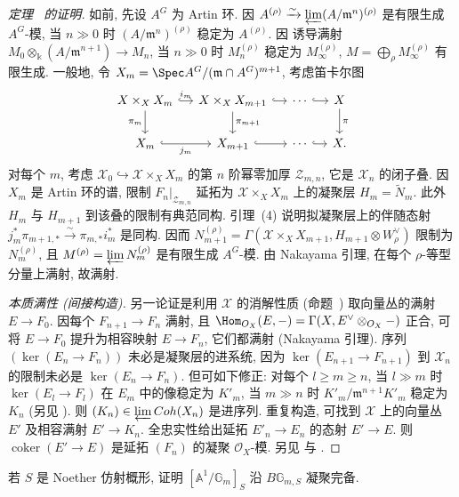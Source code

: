 \begin{proof}[定理~ 的证明]
如前, 先设 $A^G$ 为 Artin 环. 因 $A^{(\rho)}\xrightarrow{\sim}\varprojlim(A/\mathfrak m^n)^{(\rho)}$ 是有限生成 $A^G$-模, 当 $n\gg0$ 时 $(A/\mathfrak m^n)^{(\rho)}$ 稳定为 $A^{(\rho)}$. 因  诱导满射 $M_0\otimes_{\Bbbk}(A/\mathfrak m^{n+1})\to M_n$, 当 $n\gg0$ 时 $M_n^{(\rho)}$ 稳定为 $M_\infty^{(\rho)}$, $M=\bigoplus_\rho M_\infty^{(\rho)}$ 有限生成. 一般地, 令 $X_m=\Spec A^G/(\mathfrak m\cap A^G)^{m+1}$, 考虑笛卡尔图
\begin{align*}
\begin{tikzcd}[ampersand replacement=\&,column sep=small]
\mathcal X\times_XX_m\arrow[r,hook,"{i_m}"]\arrow[d,"{\pi_m}"']\&\mathcal X\times_XX_{m+1}\arrow[r,hook]\arrow[d,"{\pi_{m+1}}"]\&\cdots\arrow[r,hook]\&\mathcal X\arrow[d,"{\pi}"]\\
X_m\arrow[r,hook,"{j_m}"']\&X_{m+1}\arrow[r,hook]\&\cdots\arrow[r,hook]\&X.
\end{tikzcd}
\end{align*}
对每个 $m$, 考虑 $\mathcal X_0\hookrightarrow\mathcal X\times_XX_m$ 的第 $n$ 阶幂零加厚 $\mathcal Z_{m,n}$, 它是 $\mathcal X_n$ 的闭子叠. 因 $X_m$ 是 Artin 环的谱, 限制 $F_n|_{\mathcal Z_{m,n}}$ 延拓为 $\mathcal X\times_XX_m$ 上的凝聚层 $H_m=\widetilde N_m$. 此外 $H_m$ 与 $H_{m+1}$ 到该叠的限制有典范同构. 引理~(4) 说明拟凝聚层上的伴随态射 $j_m^*\pi_{m+1,*}\xrightarrow{\sim}\pi_{m,*}i_m^*$ 是同构. 因而
$N_{m+1}^{(\rho)}=\Gamma(\mathcal X\times_XX_{m+1},H_{m+1}\otimes W_\rho^\vee)$ 限制为 $N_m^{(\rho)}$, 且 $M^{(\rho)}=\varprojlim N_m^{(\rho)}$ 是有限生成 $A^G$-模. 由 Nakayama 引理,  在每个 $\rho$-等型分量上满射, 故满射.

\emph{本质满性 (间接构造).} 另一论证是利用 $\mathcal X$ 的消解性质 (命题~) 取向量丛的满射 $E\to F_0$. 因每个 $F_{n+1}\to F_n$ 满射, 且 $\Hom_{\mathcal O_{\mathcal X}}(E,-)=\Gamma(\mathcal X,E^\vee\otimes_{\mathcal O_{\mathcal X}}-)$ 正合, 可将 $E\to F_0$ 提升为相容映射 $E\to F_n$, 它们都满射 (Nakayama 引理). 序列 $(\ker(E_n\to F_n))$ 未必是凝聚层的进系统, 因为 $\ker(E_{n+1}\to F_{n+1})$ 到 $\mathcal X_n$ 的限制未必是 $\ker(E_n\to F_n)$. 但可如下修正: 对每个 $l\ge m\ge n$, 当 $l\gg m$ 时 $\ker(E_l\to F_l)$ 在 $E_m$ 中的像稳定为 $K'_m$, 当 $m\gg n$ 时 $K'_m/\mathfrak m^{n+1}K'_m$ 稳定为 $K_n$ (另见 \cite[Tag 087X]{SP}). 则 $(K_n)\in\varprojlim\mathsf{Coh}(\mathcal X_n)$ 是进序列. 重复构造, 可找到 $\mathcal X$ 上的向量丛 $E'$ 及相容满射 $E'\to K_n$. 全忠实性给出延拓 $E'_n\to E_n$ 的态射 $E'\to E$. 则 $\operatorname{coker}(E'\to E)$ 是延拓 $(F_n)$ 的凝聚 $\mathcal O_X$-模. 另见 \cite[定理 1.3]{AHR20} 与 \cite[定理 1.6]{AHR19}.
\end{proof}
\begin{exercise}\label{src:7.6.24}
若 $S$ 是 Noether 仿射概形, 证明 $[\mathbb A^1/\mathbb G_m]_S$ 沿 $B\mathbb G_{m,S}$ 凝聚完备.
\end{exercise}
